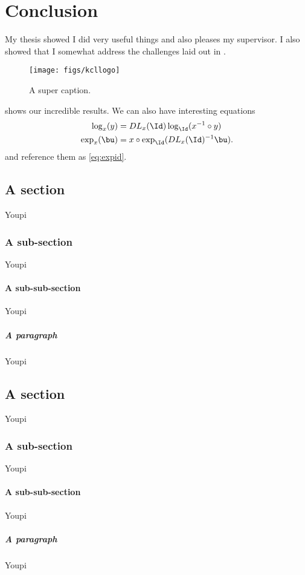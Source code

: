 \chapter{Conclusion}
\label{chap:conclusion}
\minitoc


My thesis showed I did very useful things and also pleases my supervisor. I also showed that I somewhat address the challenges laid out in .

\begin{figure}[htb!]
\centering
\texttt{[image: figs/kcllogo]}
\caption{A super caption.\label{fig:logo}}
\end{figure}

 shows our incredible results. We can also have interesting equations
\begin{align}
\log_x(y) &= DL_x(\Id) \log_{\Id}(x^{-1} \circ y) \label{eq:logid}\\
\exp_{x}(\bu) &= x \circ \exp_{\Id}( DL_x(\Id)^{-1} \bu ).
\label{eq:expid}
\end{align}
and reference them as \eqref{eq:expid}.

\section{A section}
%
Youpi

\subsection{A sub-section}
%
Youpi

\subsubsection{A sub-sub-section}
%
Youpi

\paragraph{A paragraph}
%
Youpi

\section{A section}
%
Youpi

\subsection{A sub-section}
%
Youpi

\subsubsection{A sub-sub-section}
%
Youpi

\paragraph{A paragraph}
%
Youpi